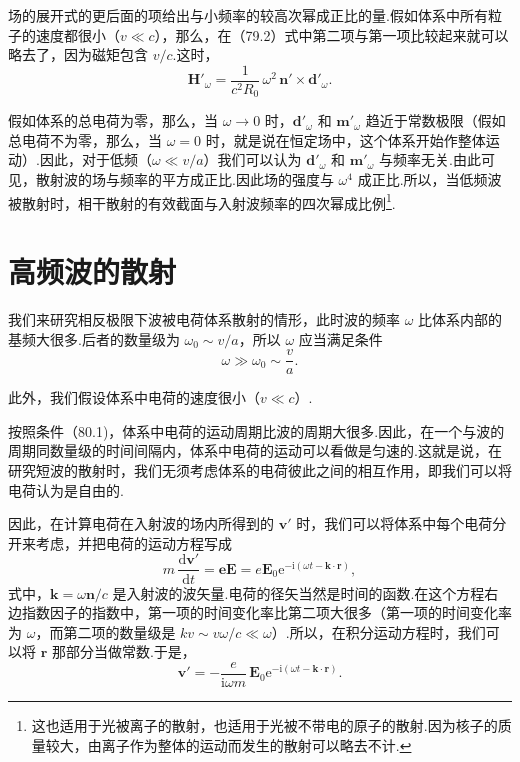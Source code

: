 场的展开式的更后面的项给出与小频率的较高次幂成正比的量.假如体系中所有粒子的速度都很小（$v\ll c$），那么，在（79.2）式中第二项与第一项比较起来就可以略去了，因为磁矩包含 $v/c$.这时，
\begin{equation}
  \boldsymbol{H}'_{\omega}=\frac{1}{c^2R_0}\,\omega^2\,\boldsymbol{n}'\times\boldsymbol{d}'_{\omega}.
\end{equation}

假如体系的总电荷为零，那么，当 $\omega\to 0$ 时，$\boldsymbol{d}'_{\omega}$ 和 $\boldsymbol{m}'_{\omega}$ 趋近于常数极限（假如总电荷不为零，那么，当 $\omega=0$ 时，就是说在恒定场中，这个体系开始作整体运动）.因此，对于低频（$\omega\ll v/a$）我们可以认为 $\boldsymbol{d}'_{\omega}$ 和 $\boldsymbol{m}'_{\omega}$ 与频率无关.由此可见，散射波的场与频率的平方成正比.因此场的强度与 $\omega^4$ 成正比.所以，当低频波被散射时，相干散射的有效截面与入射波频率的四次幂成比例\footnote{这也适用于光被离子的散射，也适用于光被不带电的原子的散射.因为核子的质量较大，由离子作为整体的运动而发生的散射可以略去不计.}.

\section{高频波的散射}

我们来研究相反极限下波被电荷体系散射的情形，此时波的频率 $\omega$ 比体系内部的基频大很多.后者的数量级为 $\omega_0\sim v/a$，所以 $\omega$ 应当满足条件
\begin{equation}
  \omega\gg\omega_0\sim\frac{v}{a}.
\end{equation}

此外，我们假设体系中电荷的速度很小（$v\ll c$）.

按照条件（80.1)，体系中电荷的运动周期比波的周期大很多.因此，在一个与波的周期同数量级的时间间隔内，体系中电荷的运动可以看做是匀速的.这就是说，在研究短波的散射时，我们无须考虑体系的电荷彼此之间的相互作用，即我们可以将电荷认为是自由的.

因此，在计算电荷在入射波的场内所得到的 $\boldsymbol{v}'$ 时，我们可以将体系中每个电荷分开来考虑，并把电荷的运动方程写成
\begin{equation*}
  m\,\frac{\mathrm{d}\boldsymbol{v}'}{\mathrm{d}t}=\boldsymbol{eE}
  =e\boldsymbol{E}_0\mathrm{e}^{-\mathrm{i}(\omega t-\boldsymbol{k}\cdot\boldsymbol{r})},
\end{equation*}
式中，$\boldsymbol{k}=\omega\boldsymbol{n}/c$ 是入射波的波矢量.电荷的径矢当然是时间的函数.在这个方程右边指数因子的指数中，第一项的时间变化率比第二项大很多（第一项的时间变化率为 $\omega$，而第二项的数量级是 $kv\sim v\omega/c\ll\omega$）.所以，在积分运动方程时，我们可以将 $\boldsymbol{r}$ 那部分当做常数.于是，
\begin{equation}
  \boldsymbol{v}'=-\frac{e}{\mathrm{i}\omega m}\,
  \boldsymbol{E}_0\mathrm{e}^{-\mathrm{i}(\omega t-\boldsymbol{k}\cdot\boldsymbol{r})}.
\end{equation}

